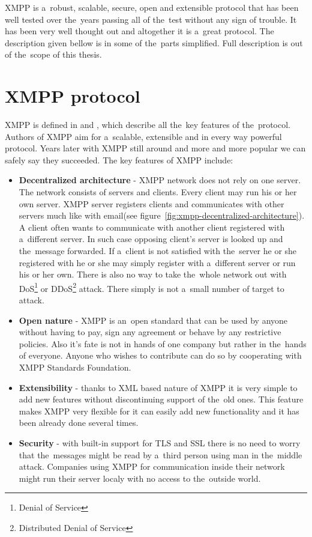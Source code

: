 XMPP is a~robust, scalable, secure, open and extensible protocol that has been well tested over the~years passing all of the~test without any sign of trouble. It has been very well thought out and altogether it is a~great protocol. The description given bellow is in some of the~parts simplified. Full description is out of the~scope of this thesis.   

\section{XMPP protocol}
XMPP is defined in \cite{xmppCoreRFC} and \cite{xmppIMRFC}, which describe all the~key features of the~protocol. Authors of XMPP aim for a~scalable, extensible and in every way powerful protocol. Years later with XMPP still around and more and more popular we can safely say they succeeded. The key features of XMPP include:

\begin{itemize}
	\item \textbf{Decentralized architecture} - XMPP network does not rely on one server. The network consists of servers and clients. Every client may run his or her own server. XMPP server registers clients and communicates with other servers much like with email(see figure~\ref{fig:xmpp-decentralized-architecture}). A client often wants to communicate with another client registered with a~different server. In such case opposing client's server is looked up and the~message forwarded. If a~client is not satisfied with the~server he or she registered with he or she may simply register with a~different server or run his or her own. There is also no way to take the~whole network out with DoS\footnote{Denial of Service} or DDoS\footnote{Distributed Denial of Service} attack. There simply is not a~small number of target to attack.    
	\item  \textbf{Open nature} - XMPP is an~open standard that can be used by anyone without having to pay, sign any agreement or behave by any restrictive policies. Also it's fate is not in hands of one company but rather in the~hands of everyone. Anyone who wishes to contribute can do so by cooperating with XMPP Standards Foundation. 
	\item \textbf{Extensibility} - thanks to XML based nature of XMPP it is very simple to add new features without discontinuing support of the~old ones. This feature makes XMPP very flexible for it can easily add new functionality and it has been already done several times.  
	\item \textbf{Security} - with built-in support for TLS and SSL there is no need to worry that the~messages might be read by a~third person using man in the~middle attack. Companies using XMPP for communication inside their network might run their server localy with no access to the~outside world.  
\end{itemize}

